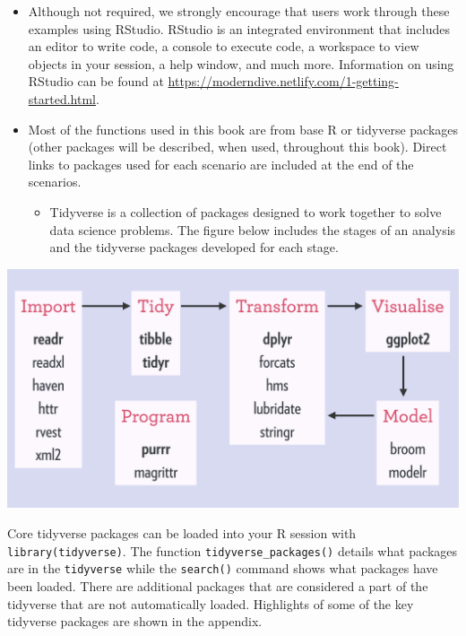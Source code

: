 \documentclass[
]{book}
\providecommand{\tightlist}{%
  \setlength{\itemsep}{0pt}\setlength{\parskip}{0pt}}
\begin{document}
\begin{itemize}
\item
  Although not required, we strongly encourage that users work through these examples using RStudio. RStudio is an integrated environment that includes an editor to write code, a console to execute code, a workspace to view objects in your session, a help window, and much more. Information on using RStudio can be found at \url{https://moderndive.netlify.com/1-getting-started.html}.
\item
  Most of the functions used in this book are from base R or tidyverse packages (other packages will be described, when used, throughout this book). Direct links to packages used for each scenario are included at the end of the scenarios.

  \begin{itemize}
  \tightlist
  \item
    Tidyverse is a collection of packages designed to work together to solve data science problems. The figure below includes the stages of an analysis and the tidyverse packages developed for each stage.
  \end{itemize}
\end{itemize}

\begin{center}\includegraphics[width=0.8\linewidth]{images/Tidyverse} \end{center}

Core tidyverse packages can be loaded into your R session with \texttt{library(tidyverse)}. The function \texttt{tidyverse\_packages()} details what packages are in the \texttt{tidyverse} while the \texttt{search()} command shows what packages have been loaded. There are additional packages that are considered a part of the tidyverse that are not automatically loaded. Highlights of some of the key tidyverse packages are shown in the appendix.
\end{document}
